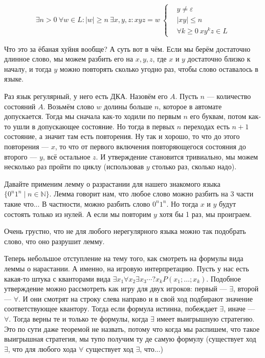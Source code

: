 \documentclass{article}
\begin{document}
\begin{itemize}
        $$
        \exists n>0~\forall w\in L:|w|\geqslant n~\exists x,y,z:xyz=w~\left\{\begin{aligned}
            &y\neq\varepsilon\\
            &|xy|\leqslant n\\
            &\forall k\geqslant0~xy^kz\in L
        \end{aligned}\right.
        $$
        \begin{Comment}
            Что это за ёбаная хуйня вообще? А суть вот в чём. Если мы берём достаточно длинное слово, мы можем разбить его на $x,y,z$, где $x$ и $y$ достаточно близко к началу, и тогда $y$ можно повторять сколько угодно раз, чтобы слово оставалось в языке.
        \end{Comment}
        \begin{Proof}
            Раз язык регулярный, у него есть ДКА. Назовём его $A$. Пусть $n$ --- количество состояний $A$. Возьмём слово $w$ долины больше $n$, которое в автомате допускается. Тогда мы сначала как-то ходили по первым $n$ его буквам, потом как-то ушли в допускающее состояние. Но тогда в первых $n$ переходах есть $n+1$ состояние, а значит там есть повторения. Ну так и хорошо, то что до этого повторения --- $x$, то что от первого включения повторяющегося состояния до второго --- $y$, всё остальное $z$. И утверждение становится тривиально, мы можем несколько раз пройти по циклу (использовав $y$ столько раз, сколько надо).
        \end{Proof}
        \begin{Example}
            Давайте применим лемму о разрастании для нашего знакомого языка $\{0^n1^n\mid n\in\mathbb N\}$. Лемма говорит нам, что любое слово можно разбить на 3 части такие что... В частности, можно разбить слово $0^n1^n$. Но тогда $x$ и $y$ будут состоять только из нулей. А если мы повторим $y$ хотя бы 1 раз, мы проиграем.
        \end{Example}
        \begin{Proof}
            Очень грустно, что не для любого нерегулярного языка можно так подобрать слово, что оно разрушит лемму.
        \end{Proof}
        \begin{Comment}
            Теперь небольшое отступление на тему того, как смотреть на формулы вида леммы о нарастании. А именно, на игровую интерпретацию. Пусть у нас есть какая-то штука с кванторами вида $\exists x_1\forall x_2\exists x_3\cdots?x_kP(x_1;\ldots;x_k)$. Подобное утверждение можно рассмотреть как игру для двух игроков: первый --- $\exists$, второй --- $\forall$. И они смотрят на строку слева направо и в свой ход подбирают значение соответствующее квантору. Тогда если формула истинна, побеждает $\exists$, иначе --- $\forall$. Тогда верны те и только те формулы, когда $\exists$ имеет выигрышную стратегию. Это по сути даже теоремой не назвать, потому что когда мы распишем, что такое выигрышная стратегия, мы тупо получим ту де самую формулу (существует ход $\exists$, что для любого хода $\forall$ существует ход $\exists$, что...)\\

\end{Comment}
\end{itemize}
\end{document}
